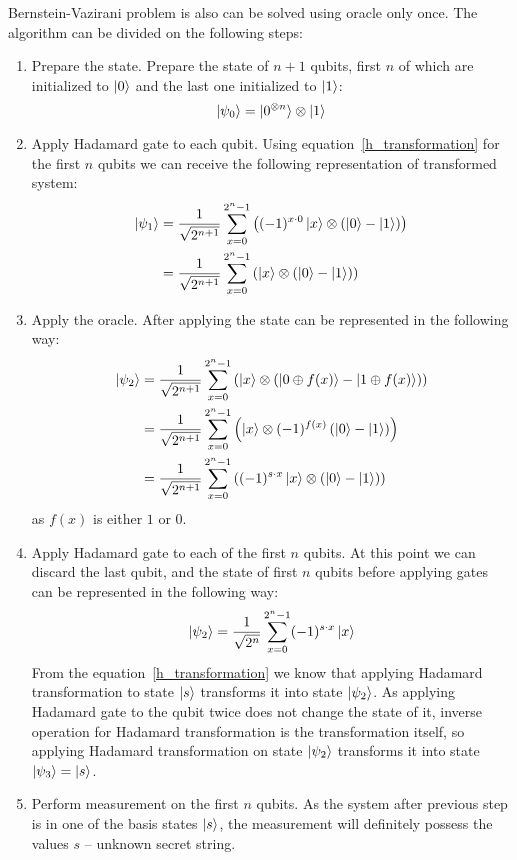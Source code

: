 Bernstein-Vazirani problem is also can be solved using oracle only once.
The algorithm can be divided on the following steps:
\begin{enumerate}
    \item Prepare the state.
    Prepare the state of $n+1$ qubits, first $n$ of which are initialized to $\ket{0}$ and the last one initialized to $\ket{1}$:
    \[\ket{\psi_0} = \ket{0^{\otimes n}}\otimes\ket{1}\]
    \item Apply Hadamard gate to each qubit.
    Using equation~\eqref{h_transformation} for the first $n$ qubits we can receive the following representation of transformed system:
    \begin{align*}
        \ket{\psi_1} &= \frac{1}{\sqrt{2^{n+1}}} \sum_{x=0}^{2^n-1}\left((-1)^{x\cdot0}\ket{x}\otimes\left(\ket{0} - \ket{1}\right)\right) \\
        &=\frac{1}{\sqrt{2^{n+1}}} \sum_{x=0}^{2^n-1}\left(\ket{x}\otimes\left(\ket{0} - \ket{1}\right)\right)
    \end{align*}
    \item Apply the oracle.
    After applying the state can be represented in the following way:
    \begin{align*}
        \ket{\psi_2} &= \frac{1}{\sqrt{2^{n+1}}} \sum_{x=0}^{2^n-1}\left(\ket{x}\otimes\left(\ket{0\oplus f(x)} - \ket{1\oplus f(x)}\right)\right) \\
        &= \frac{1}{\sqrt{2^{n+1}}} \sum_{x=0}^{2^n-1}\left(\ket{x}\otimes(-1)^{f(x)}\left(\ket{0} - \ket{1}\right)\right) \\
        &= \frac{1}{\sqrt{2^{n+1}}} \sum_{x=0}^{2^n-1}\left((-1)^{s\cdot x}\ket{x}\otimes\left(\ket{0} - \ket{1}\right)\right)
    \end{align*}
    as $f(x)$ is either $1$ or $0$.
    \item Apply Hadamard gate to each of the first $n$ qubits.
    At this point we can discard the last qubit, and the state of first $n$ qubits before applying gates can be represented in the following way:
    \[
        \ket{\psi_2} = \frac{1}{\sqrt{2^{n}}} \sum_{x=0}^{2^n-1}(-1)^{s\cdot x}\ket{x}
    \]
    From the equation~\eqref{h_transformation} we know that applying Hadamard transformation to state $\ket{s}$ transforms it into state $\ket{\psi_2}$.
    As applying Hadamard gate to the qubit twice does not change the state of it, inverse operation for Hadamard transformation is the transformation itself, so applying Hadamard transformation on state $\ket{\psi_2}$ transforms it into state $\ket{\psi_3} = \ket{s}$.
    \item Perform measurement on the first $n$ qubits.
    As the system after previous step is in one of the basis states $\ket{s}$, the measurement will definitely possess the values $s$ -- unknown secret string.
\end{enumerate}

